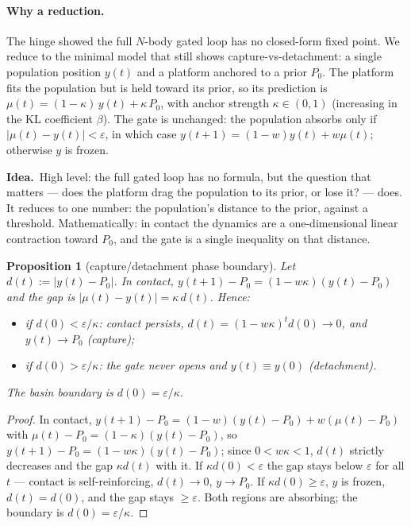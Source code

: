 \documentclass[11pt]{article}
\newtheorem{proposition}{Proposition}
\theoremstyle{definition}
\newcommand{\idea}[1]{\par\medskip\noindent\textbf{Idea.}\ #1\par\medskip}
\begin{document}
\paragraph{Why a reduction.} The hinge showed the full $N$-body gated loop has no
closed-form fixed point. We reduce to the minimal model that still shows
capture-vs-detachment: a single population position $y(t)$ and a platform anchored to a
prior $P_0$. The platform fits the population but is held toward its prior, so its
prediction is $\mu(t)=(1-\kappa)\,y(t)+\kappa\,P_0$, with anchor strength
$\kappa\in(0,1)$ (increasing in the KL coefficient $\beta$). The gate is unchanged: the
population absorbs only if $|\mu(t)-y(t)|<\varepsilon$, in which case
$y(t+1)=(1-w)y(t)+w\mu(t)$; otherwise $y$ is frozen.

\idea{High level: the full gated loop has no formula, but the question that matters ---
does the platform drag the population to its prior, or lose it? --- does. It reduces to
one number: the population's distance to the prior, against a threshold. Mathematically:
in contact the dynamics are a one-dimensional linear contraction toward $P_0$, and the
gate is a single inequality on that distance.}

\begin{proposition}[capture/detachment phase boundary]\label{prop:twobody}
Let $d(t):=|y(t)-P_0|$. In contact, $y(t+1)-P_0=(1-w\kappa)(y(t)-P_0)$ and the gap is
$|\mu(t)-y(t)|=\kappa\,d(t)$. Hence:
\begin{itemize}
\item if $d(0)<\varepsilon/\kappa$: contact persists, $d(t)=(1-w\kappa)^t d(0)\to0$, and
$y(t)\to P_0$ \emph{(capture)};
\item if $d(0)>\varepsilon/\kappa$: the gate never opens and $y(t)\equiv y(0)$
\emph{(detachment)}.
\end{itemize}
The basin boundary is $d(0)=\varepsilon/\kappa$.
\end{proposition}
\begin{proof}
In contact, $y(t+1)-P_0=(1-w)(y(t)-P_0)+w(\mu(t)-P_0)$ with
$\mu(t)-P_0=(1-\kappa)(y(t)-P_0)$, so $y(t+1)-P_0=(1-w\kappa)(y(t)-P_0)$; since
$0<w\kappa<1$, $d(t)$ strictly decreases and the gap $\kappa d(t)$ with it. If
$\kappa d(0)<\varepsilon$ the gap stays below $\varepsilon$ for all $t$ --- contact is
self-reinforcing, $d(t)\to0$, $y\to P_0$. If $\kappa d(0)\ge\varepsilon$, $y$ is frozen,
$d(t)=d(0)$, and the gap stays $\ge\varepsilon$. Both regions are absorbing; the boundary
is $d(0)=\varepsilon/\kappa$.
\end{proof}
\end{document}

